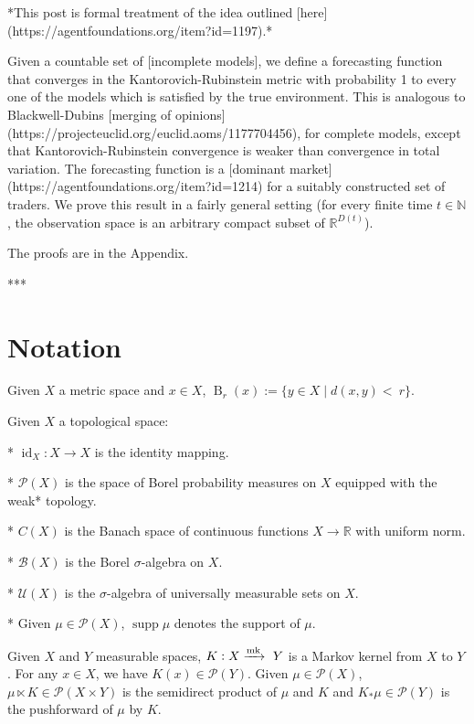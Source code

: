 \documentclass[a4paper]{article}
\DeclareMathOperator{\Supp}{supp}
\newcommand{\Nats}{\mathbb{N}}
\newcommand{\Reals}{\mathbb{R}}
\newcommand{\Markov}{\xrightarrow{\textnormal{mk}}}
\newcommand{\Prob}{\mathcal{P}}
\newcommand{\UM}{\mathcal{U}}
\newcommand{\I}{\operatorname{id}}
\newcommand{\Ball}{\operatorname{B}}
\begin{document}
*This post is formal treatment of the idea outlined [here](https://agentfoundations.org/item?id=1197).*

Given a countable set of [incomplete models], we define a forecasting function that converges in the Kantorovich-Rubinstein metric with probability 1 to every one of the models which is satisfied by the true environment. This is analogous to Blackwell-Dubins [merging of opinions](https://projecteuclid.org/euclid.aoms/1177704456), for complete models, except that Kantorovich-Rubinstein convergence is weaker than convergence in total variation. The forecasting function is a [dominant market](https://agentfoundations.org/item?id=1214) for a suitably constructed set of traders. We prove this result in a fairly general setting (for every finite time $t \in \Nats$, the observation space is an arbitrary compact subset of $\Reals^{D(t)}$).%

The proofs are in the Appendix.

***

\section{Notation}

Given ${X}$ a metric space and ${x \in X}$, ${\Ball_r(x):=\{y \in X \mid d(x,y) <\ r\}}$.

Given ${X}$ a topological space:

* ${\I_X: X \rightarrow X}$ is the identity mapping.

* ${\Prob(X)}$ is the space of Borel probability measures on ${X}$ equipped with the weak* topology.

* ${C(X)}$ is the Banach space of continuous functions ${X \rightarrow \Reals}$ with uniform norm.

* ${\mathcal{B}}(X)$ is the Borel ${\sigma}$-algebra on ${X}$.

* ${\UM(X)}$ is the ${\sigma}$-algebra of universally measurable sets on ${X}$.

* Given ${\mu \in \Prob(X)}$, ${\Supp \mu}$ denotes the support of ${\mu}$. 

Given ${X}$ and ${Y}$ measurable spaces, ${K: X \Markov\ Y}$ is a Markov kernel from ${X}$ to ${Y}$. For any ${x \in X}$, we have ${K(x) \in \Prob(Y)}$. Given ${\mu \in \Prob(X)}$, ${\mu \ltimes K \in \Prob(X \times Y)}$ is the semidirect product of ${\mu}$ and ${K}$ and ${K_*\mu \in \Prob(Y)}$ is the pushforward of ${\mu}$ by ${K}$.
\end{document}
